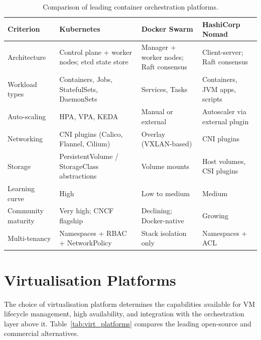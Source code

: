 \documentclass[12pt,a4paper]{report}
\begin{document}
\begin{table}[htbp]
\centering
\caption{Comparison of leading container orchestration platforms.}
\label{tab:orchestration}
\begin{tabular}{L{2.8cm} L{3.8cm} L{3.8cm} L{3.8cm}}
\toprule
\textbf{Criterion} & \textbf{Kubernetes} & \textbf{Docker Swarm} & \textbf{HashiCorp Nomad} \\
\midrule
Architecture        & Control plane + worker nodes; etcd state store & Manager + worker nodes; Raft consensus & Client-server; Raft consensus \\
\addlinespace
Workload types      & Containers, Jobs, StatefulSets, DaemonSets & Services, Tasks & Containers, JVM apps, scripts \\
\addlinespace
Auto-scaling        & HPA, VPA, KEDA & Manual or external & Autoscaler via external plugin \\
\addlinespace
Networking          & CNI plugins (Calico, Flannel, Cilium) & Overlay (VXLAN-based) & CNI plugins \\
\addlinespace
Storage             & PersistentVolume / StorageClass abstractions & Volume mounts & Host volumes, CSI plugins \\
\addlinespace
Learning curve      & High & Low to medium & Medium \\
\addlinespace
Community maturity  & Very high; CNCF flagship & Declining; Docker-native & Growing \\
\addlinespace
Multi-tenancy       & Namespaces + RBAC + NetworkPolicy & Stack isolation only & Namespaces + ACL \\
\bottomrule
\end{tabular}
\end{table}

\section{Virtualisation Platforms}

The choice of virtualisation platform determines the capabilities available for
VM lifecycle management, high availability, and integration with the orchestration
layer above it. Table~\ref{tab:virt_platforms} compares the leading open-source and
commercial alternatives.
\end{document}
